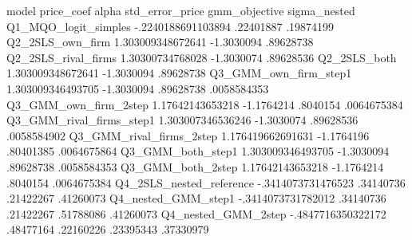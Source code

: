 model	price_coef	alpha	std_error_price	gmm_objective	sigma_nested
Q1_MQO_logit_simples	-.2240188691103894	.22401887	.19874199		
Q2_2SLS_own_firm	1.303009348672641	-1.3030094	.89628738		
Q2_2SLS_rival_firms	1.30300734768028	-1.3030074	.89628536		
Q2_2SLS_both	1.303009348672641	-1.3030094	.89628738		
Q3_GMM_own_firm_step1	1.303009346493705	-1.3030094	.89628738	.0058584353	
Q3_GMM_own_firm_2step	1.17642143653218	-1.1764214	.8040154	.0064675384	
Q3_GMM_rival_firms_step1	1.303007346536246	-1.3030074	.89628536	.0058584902	
Q3_GMM_rival_firms_2step	1.176419662691631	-1.1764196	.80401385	.0064675864	
Q3_GMM_both_step1	1.303009346493705	-1.3030094	.89628738	.0058584353	
Q3_GMM_both_2step	1.17642143653218	-1.1764214	.8040154	.0064675384	
Q4_2SLS_nested_reference	-.3414073731476523	.34140736	.21422267		.41260073
Q4_nested_GMM_step1	-.3414073731782012	.34140736	.21422267	.51788086	.41260073
Q4_nested_GMM_2step	-.4847716350322172	.48477164	.22160226	.23395343	.37330979
